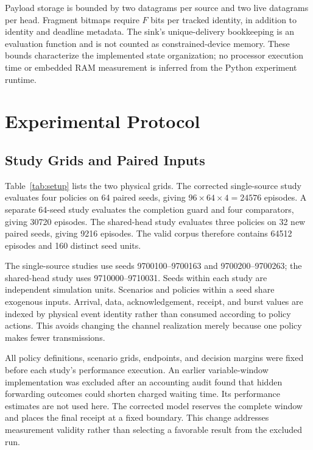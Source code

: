 \documentclass[journal,10pt]{IEEEtran}
\begin{document}
Payload storage is bounded by two datagrams per source and two live datagrams per head. Fragment bitmaps require $F$ bits per tracked identity, in addition to identity and deadline metadata. The sink's unique-delivery bookkeeping is an evaluation function and is not counted as constrained-device memory. These bounds characterize the implemented state organization; no processor execution time or embedded RAM measurement is inferred from the Python experiment runtime.

\section{Experimental Protocol}
\subsection{Study Grids and Paired Inputs}
Table~\ref{tab:setup} lists the two physical grids. The corrected single-source study evaluates four policies on 64 paired seeds, giving $96\times64\times4=24576$ episodes. A separate 64-seed study evaluates the completion guard and four comparators, giving 30720 episodes. The shared-head study evaluates three policies on 32 new paired seeds, giving 9216 episodes. The valid corpus therefore contains 64512 episodes and 160 distinct seed units.

The single-source studies use seeds 9700100--9700163 and 9700200--9700263; the shared-head study uses 9710000--9710031. Seeds within each study are independent simulation units. Scenarios and policies within a seed share exogenous inputs. Arrival, data, acknowledgement, receipt, and burst values are indexed by physical event identity rather than consumed according to policy actions. This avoids changing the channel realization merely because one policy makes fewer transmissions.

All policy definitions, scenario grids, endpoints, and decision margins were fixed before each study's performance execution. An earlier variable-window implementation was excluded after an accounting audit found that hidden forwarding outcomes could shorten charged waiting time. Its performance estimates are not used here. The corrected model reserves the complete window and places the final receipt at a fixed boundary. This change addresses measurement validity rather than selecting a favorable result from the excluded run.
\end{document}

